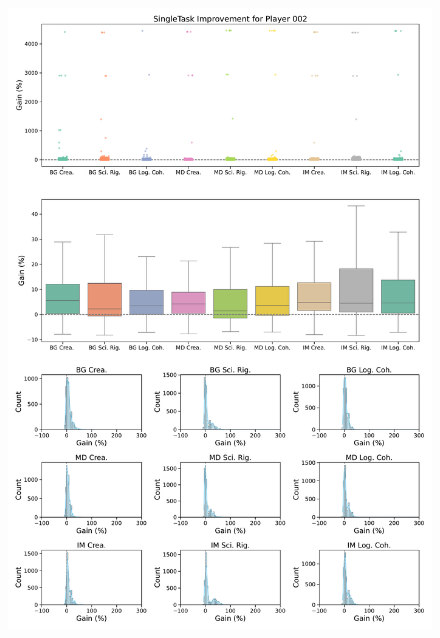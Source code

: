 \begin{figure}[ht]
  \centering
  \includegraphics[width=\textwidth]{figures/gain_validity/singletask/singletask_gain_player_00002.pdf}
\end{figure}
\clearpage

